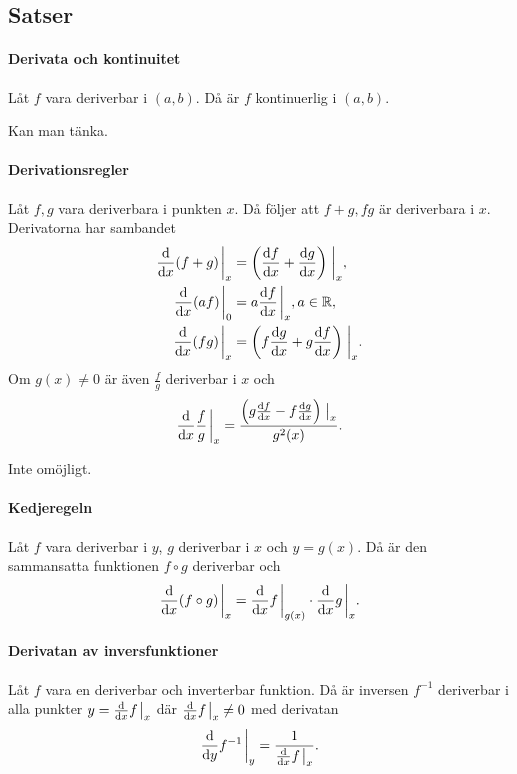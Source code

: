 \subsection{Satser}

\paragraph{Derivata och kontinuitet}
Låt $f$ vara deriverbar i $(a, b)$. Då är $f$ kontinuerlig i $(a, b)$.

\proof
Kan man tänka.

\paragraph{Derivationsregler}
Låt $f, g$ vara deriverbara i punkten $x$. Då följer att $f + g, fg$ är deriverbara i $x$. Derivatorna har sambandet
\begin{align*}
	\dv{x}(f + g)\eval_x &= \left(\dv{f}{x} + \dv{g}{x}\right)\eval_x, \\
	\dv{x}(af)\eval_0    &= a\dv{f}{x}\eval_x, a\in\R, \\
	\dv{x}(fg)\eval_x    &= \left(f\dv{g}{x} + g\dv{f}{x}\right)\eval_x. \\
\end{align*}
Om $g(x)\neq 0$ är även $\frac{f}{g}$ deriverbar i $x$ och
\begin{align*}
	\dv{x}\frac{f}{g}\eval_x = \frac{\left(g\dv{f}{x} - f\dv{g}{x}\right)\eval_x}{g^2(x)}.
\end{align*}

\proof
Inte omöjligt.

\paragraph{Kedjeregeln}
Låt $f$ vara deriverbar i $y$, $g$ deriverbar i $x$ och $y = g(x)$. Då är den sammansatta funktionen $f\circ g$ deriverbar och
\begin{align*}
	\dv{x}(f\circ g)\eval_x = \dv{x}f\eval_{g(x)}\cdot\dv{x}g\eval_x.
\end{align*}

\paragraph{Derivatan av inversfunktioner}
Låt $f$ vara en deriverbar och inverterbar funktion. Då är inversen $f^{-1}$ deriverbar i alla punkter $y = \dv{x}f\eval_x$ där $\dv{x}f\eval_x\neq 0$ med derivatan
\begin{align*}
	\dv{y}f^{-1}\eval_y = \frac{1}{\dv{x}f\eval_x}.
\end{align*}

